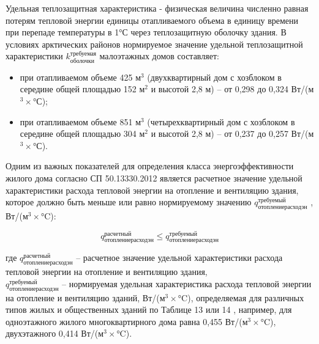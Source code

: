 Удельная теплозащитная характеристика - физическая величина численно равная потерям тепловой энергии единицы отапливаемого объема
в единицу времени при перепаде температуры в 1°С через теплозащитную оболочку здания.
В условиях арктических районов нормируемое значение удельной теплозащитной характеристики $k_\text{оболочки}^\text{требуемая}$  малоэтажных домов составляет:
\begin{itemize}
    \item при отапливаемом объеме 425 м$^3$ (двухквартирный дом с хозблоком в середине общей площадью 152 м$^2$ и высотой 2,8 м) – от 0,298 до 0,324 Вт/(м$^3 \times$°С);
    \item при отапливаемом объеме 851 м$^3$ (четырехквартирный дом с хозблоком в середине общей площадью 304 м$^2$ и высотой 2,8 м) – от 0,237 до 0,257 Вт/(м$^3 \times$°С).
\end{itemize}

Одним из важных показателей для определения класса энергоэффективности жилого дома согласно  СП 50.13330.2012 \cite{law_RU_Rules_Code_ThermalPerformance}
является расчетное значение удельной характеристики расхода тепловой энергии на отопление и вентиляцию здания, которое должно быть меньше или равно нормируемому
значению $q_\text{отоплениерасходэн}^\text{требуемый}$  , Вт/(м$^3 \times$°C):

\begin{eqndesc}
    \begin{equation}\label{eq:heatconsumectequal}
        q_\text{отоплениерасходэн}^\text{расчетный}   \leqslant   q_\text{отоплениерасходэн}^\text{требуемый}
    \end{equation}

    где $q_\text{отоплениерасходэн}^\text{расчетный}$ -- расчетное значение удельной характеристики расхода тепловой энергии на отопление и вентиляцию здания, \\
    $q_\text{отоплениерасходэн}^\text{требуемый}$ -- нормируемая удельная характеристика расхода тепловой энергии на отопление и вентиляцию зданий, Вт/(м$^3 \times$°C),
    определяемая для различных типов жилых и общественных зданий по Таблице 13 или 14 \cite{law_RU_Rules_Code_ThermalPerformance},
    например, для одноэтажного жилого многоквартирного дома равна 0,455 Вт/(м$^3 \times$°C), двухэтажного 0,414 Вт/(м$^3 \times$°C).
\end{eqndesc}


